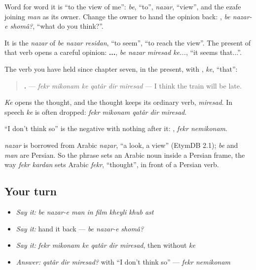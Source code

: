Word for word it is \textquotedblleft{}to the view of me\textquotedblright{}: \emph{be}, \textquotedblleft{}to\textquotedblright{}, \emph{nazar}, \textquotedblleft{}view\textquotedblright{}, and the ezafe joining \emph{man} as its owner. Change the owner to hand the opinion back: \textbf{  }, \emph{be nazar-e shomâ?}, \textquotedblleft{}what do you think?\textquotedblright{}.

It is the \emph{nazar} of \emph{be nazar residan}, \textquotedblleft{}to seem\textquotedblright{}, \textquotedblleft{}to reach the view\textquotedblright{}. The present of that verb opens a careful opinion: \textbf{   ...}, \emph{be nazar miresad ke...}, \textquotedblleft{}it seems that...\textquotedblright{}.

\begin{grammarlens}[title={Grammar Lens: fekr mikonam ke}]
The verb you have held since chapter seven, in the present, with \textbf{}, \emph{ke}, \textquotedblleft{}that\textquotedblright{}:

\begin{quote}
\textbf{     .} — \emph{fekr mikonam ke qatâr dir miresad} — I think the train will be late.
\end{quote}

\emph{Ke} opens the thought, and the thought keeps its ordinary verb, \emph{miresad}. In speech \emph{ke} is often dropped: \emph{fekr mikonam qatâr dir miresad}.

\textquotedblleft{}I don't think so\textquotedblright{} is the negative with nothing after it: \textbf{ }, \emph{fekr nemikonam}.
\end{grammarlens}

\begin{cousinweb}
\emph{nazar} is borrowed from Arabic \emph{naẓar}, \textquotedblleft{}a look, a view\textquotedblright{} (EtymDB 2.1); \emph{be} and \emph{man} are Persian. So the phrase sets an Arabic noun inside a Persian frame, the way \emph{fekr kardan} sets Arabic \emph{fekr}, \textquotedblleft{}thought\textquotedblright{}, in front of a Persian verb.
\end{cousinweb}

\subsection*{Your turn}
\begin{itemize}
\raggedright
  \item \emph{Say it:} \emph{be nazar-e man in film kheyli khub ast}
  \item \emph{Say it:} hand it back — \emph{be nazar-e shomâ?}
  \item \emph{Say it:} \emph{fekr mikonam ke qatâr dir miresad}, then without \emph{ke}
  \item \emph{Answer:} \emph{qatâr dir miresad?} with \textquotedblleft{}I don't think so\textquotedblright{} — \emph{fekr nemikonam}
\end{itemize}

